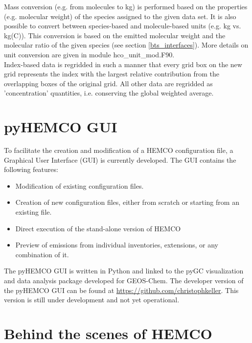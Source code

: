 \documentclass[12pt,a4paper]{article} %
\begin{document}
\begin{description}
Mass conversion (e.g. from molecules to kg) is performed based on the properties (e.g. molecular weight) of the species assigned to the given data set. It is also possible to convert between species-based and molecule-based units (e.g. kg vs. kg(C)). This conversion is based on the emitted molecular weight and the molecular ratio of the given species (see section \ref{bts_interfaces}). More details on unit conversion are given in module hco\_unit\_mod.F90.\\
Index-based data is regridded in such a manner that every grid box on the new grid represents the index with the largest relative contribution from the overlapping boxes of the original grid. All other data are regridded as 'concentration' quantities, i.e. conserving the global weighted average.
\end{description}

\section{pyHEMCO GUI} \label{pyHEMCO_GUI}
To facilitate the creation and modification of a HEMCO configuration file, a Graphical User Interface (GUI) is currently developed. The GUI contains the following features:
\begin{itemize}
\item Modification of existing configuration files.
\item Creation of new configuration files, either from scratch or starting from an existing file.
\item Direct execution of the stand-alone version of HEMCO
\item Preview of emissions from individual inventories, extensions, or any combination of it.
\end{itemize}
The pyHEMCO GUI is written in Python and linked to the pyGC visualization and data analysis package developed for GEOS-Chem. The developer version of the pyHEMCO GUI can be found at \url{https://github.com/christophkeller}. This version is still under development and not yet operational.

\section{Behind the scenes of HEMCO} \label{Behind_scenes}
\end{document}
